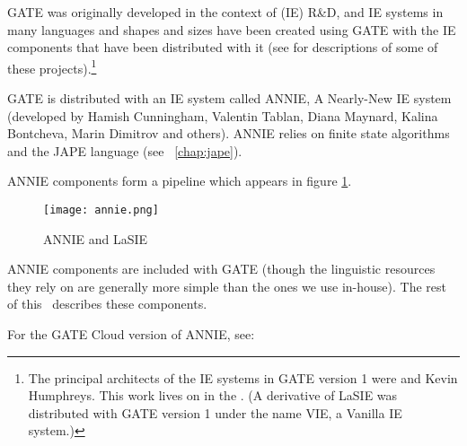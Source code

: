 %
%
%
%
\nnormalsize
%
GATE was originally developed in the context of
(IE) R\&D, and IE systems in many languages and shapes and sizes have
been created using GATE with the IE components that have been
distributed with it (see \cite{May00a} for descriptions of some of
these projects).\footnote{The principal architects of the IE systems
in GATE version 1 were
 and
Kevin Humphreys. This work lives on in the
.
(A derivative of
LaSIE was distributed with GATE version 1 under the name VIE, a Vanilla
IE system.)}

GATE is distributed with an IE system called ANNIE,
A Nearly-New IE system (developed by Hamish Cunningham,
Valentin Tablan, Diana Maynard, Kalina Bontcheva, Marin Dimitrov and
others).  ANNIE relies on finite state algorithms and the
JAPE language (see \Chapthing~\ref{chap:jape}).

ANNIE components form a pipeline which appears in figure \ref{fig:annie1}.
%
\begin{figure}[htbp]
\begin{center}
\texttt{[image: annie.png]}
\end{center}
\caption{ANNIE and LaSIE}
\label{fig:annie1}
\end{figure}
%
ANNIE components are included with GATE (though the linguistic resources they
rely on are generally more simple than the ones we use in-house). The rest of
this \chapthing\ describes these components.

For the GATE Cloud version of ANNIE, see: \\



